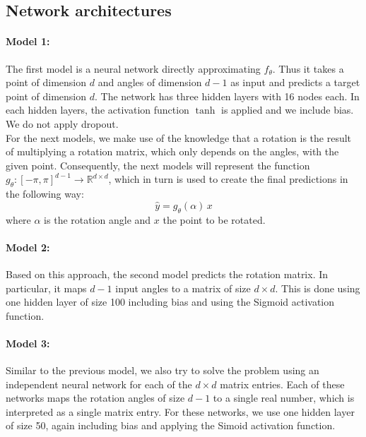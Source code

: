 \subsection{Network architectures}
\label{ssec:network_architectures}
\paragraph{Model 1:}The first model is a neural network directly approximating $f_\theta$. Thus it takes a point of dimension $d$ and angles of dimension $d-1$ as input and predicts a target point of dimension $d$. The network has three hidden layers with 16 nodes each. In each hidden layers, the activation function $\tanh$ is applied and we include bias. We do not apply dropout.\\

For the next models, we make use of the knowledge that a rotation is the result of multiplying a rotation matrix, which only depends on the angles, with the given point. Consequently, the next models will represent the function $g_\theta: [-\pi, \pi]^{d-1} \to \mathbb{R}^{d \times d}$, which in turn is used to create the final predictions in the following way:
\begin{equation}
\label{eq:rot_pred}
\hat{y} = g_\theta(\alpha) \, x
\end{equation}
where $\alpha$ is the rotation angle and $x$ the point to be rotated.

\paragraph{Model 2:} Based on this approach, the second model predicts the rotation matrix. In particular, it maps $d-1$ input angles to a matrix of size $d \times d$. This is done using one hidden layer of size 100 including bias and using the Sigmoid activation function. 

\paragraph{Model 3:} Similar to the previous model, we also try to solve the problem using an independent neural network for each of the $d \times d$ matrix entries. Each of these networks maps the rotation angles of size $d-1$ to a single real number, which is interpreted as a single matrix entry. For these networks, we use one hidden layer of size 50, again including bias and applying the Simoid activation function.\\

